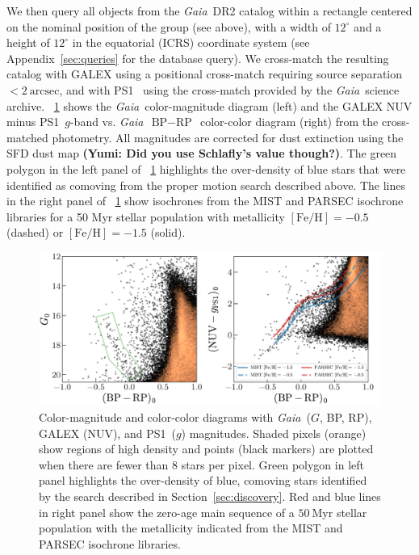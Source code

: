 \documentclass[modern]{aastex62}
\newcommand{\acronym}[1]{{\small{#1}}}
\newcommand{\gaia}{\textsl{Gaia}}
\newcommand{\pans}{\acronym{PS1}}
\newcommand{\DR}[1]{\acronym{DR#1}}
\newcommand{\sectionname}{Section}
\newcommand{\feh}{\ensuremath{[\textrm{Fe} / \textrm{H}]}}
\newcommand{\bprp}{\ensuremath{\textrm{BP} - \textrm{RP}}}
\begin{document}
We then query all objects from the \gaia\ \DR{2} catalog within a rectangle centered on the nominal position of the group (see above), with a width of $12^\circ$ and a height of $12^\circ$ in the equatorial (ICRS) coordinate system (see Appendix~\ref{sec:queries} for the database query).
We cross-match the resulting catalog with \acronym{GALEX} \citep{Martin:2005} using a positional cross-match requiring source separation $<2~\textrm{arcsec}$, and with \pans\ \citep{Chambers:2016} using the cross-match provided by the \gaia\ science archive.
\figurename~\ref{fig:cmds} shows the \gaia\ color-magnitude diagram (left) and the \acronym{GALEX} NUV minus \pans\ $g$-band vs. \gaia\ \bprp\ color-color diagram (right) from the cross-matched photometry.
All magnitudes are corrected for dust extinction using the SFD \citep{Schlegel:1998} dust map {\bf (Yumi: Did you use Schlafly's value though?)}.
The green polygon in the left panel of \figurename~\ref{fig:cmds} highlights the over-density of blue stars that were identified as comoving from the proper motion search described above.
The lines in the right panel of \figurename~\ref{fig:cmds} show isochrones from the \acronym{MIST} \citep[blue;][]{Choi:2016} and \acronym{PARSEC} \citep[red;][]{Bressan:2012, Marigo:2017} isochrone libraries for a 50 Myr stellar population with metallicity $\feh = -0.5$ (dashed) or $\feh = -1.5$ (solid).

\begin{figure}
\centering
\includegraphics[width=\textwidth]{figures/gaia-galex-cmd.pdf}
\caption{Color-magnitude and color-color diagrams with \gaia\ ($G$, BP, RP), \acronym{GALEX} (NUV), and \pans\ ($g$) magnitudes.
Shaded pixels (orange) show regions of high density and points (black markers) are plotted when there are fewer than 8 stars per pixel.
Green polygon in left panel highlights the over-density of blue, comoving stars identified by the search described in \sectionname~\ref{sec:discovery}.
Red and blue lines in right panel show the zero-age main sequence of a $50~\textrm{Myr}$ stellar population with the metallicity indicated from the \acronym{MIST} \citep{TODO} and \acronym{PARSEC} \citep{TODO} isochrone libraries.
}
\label{fig:cmds}
\end{figure}
\end{document}
